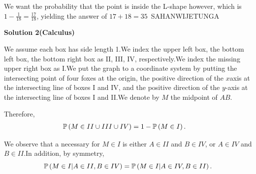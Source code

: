 \begin{enumerate}
 We want the probability that the point is inside the L-shape however, which is $1-\frac{1}{18}=\frac{17}{18}$, yielding the answer of $17+18=\boxed{35}$~SAHANWIJETUNGA

 



\textbf{Solution 2(Calculus)}

We assume each box has side length 1.We index the upper left box, the bottom left box, the bottom right box as II, III, IV, respectively.We index the missing upper right box as I.We put the graph to a coordinate system by putting the intersecting point of four foxes at the origin, the positive direction of the $x$axis at the intersecting line of boxes I and IV, and the positive direction of the $y$-axis at the intersecting line of boxes I and II.We denote by $M$ the midpoint of $AB$.

 Therefore,
 \begin{align*} \Bbb P \left( M \in II \cup III \cup IV \right) & = 1 - \Bbb P \left( M \in I \right) . \end{align*}


 We observe that a necessary for $M \in I$ is either $A \in II$ and $B \in IV$, or $A \in IV$ and $B \in II$.In addition, by symmetry,
 \[ \Bbb P \left( M \in I | A \in II, B \in IV \right) = \Bbb P \left( M \in I | A \in IV, B \in II \right) . \]


\end{enumerate}
